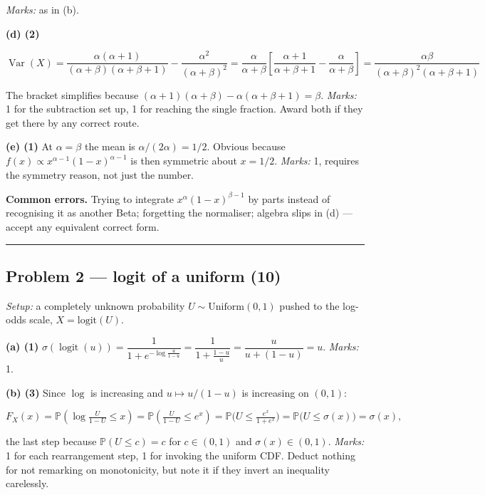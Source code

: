 \documentclass[
  11pt,
  a4paper,
]{article}
\newcommand{\PP}{\mathbb{P}}
\newcommand{\Var}{\operatorname{Var}}
\newcommand{\sig}{\sigma}
\begin{document}
\emph{Marks:} as in (b).

\textbf{(d) (2)}

\[
\Var(X) = \frac{\alpha(\alpha+1)}{(\alpha+\beta)(\alpha+\beta+1)} - \frac{\alpha^2}{(\alpha+\beta)^2}
= \frac{\alpha}{\alpha+\beta}\left[\frac{\alpha+1}{\alpha+\beta+1} - \frac{\alpha}{\alpha+\beta}\right]
= \boxed{\dfrac{\alpha\beta}{(\alpha+\beta)^2(\alpha+\beta+1)}}
\]

The bracket simplifies because
\((\alpha+1)(\alpha+\beta) - \alpha(\alpha+\beta+1) = \beta\).
\emph{Marks:} 1 for the subtraction set up, 1 for reaching the single
fraction. Award both if they get there by any correct route.

\textbf{(e) (1)} At \(\alpha=\beta\) the mean is
\(\alpha/(2\alpha) = 1/2\). Obvious because
\(f(x) \propto x^{\alpha-1}(1-x)^{\alpha-1}\) is then symmetric about
\(x = 1/2\). \emph{Marks:} 1, requires the symmetry reason, not just the
number.

\textbf{Common errors.} Trying to integrate \(x^\alpha(1-x)^{\beta-1}\)
by parts instead of recognising it as another Beta; forgetting the
normaliser; algebra slips in (d) --- accept any equivalent correct form.

\begin{center}\rule{0.5\linewidth}{0.5pt}\end{center}

\subsection{Problem 2 --- logit of a uniform
(10)}\label{problem-2-logit-of-a-uniform-10}

\emph{Setup:} a completely unknown probability
\(U\sim\mathrm{Uniform}(0,1)\) pushed to the log-odds scale,
\(X=\mathrm{logit}(U)\).

\textbf{(a) (1)}
\(\sig(\operatorname{logit}(u)) = \dfrac{1}{1+e^{-\log\frac{u}{1-u}}}
= \dfrac{1}{1+\frac{1-u}{u}} = \dfrac{u}{u + (1-u)} = u\). \emph{Marks:}
1.

\textbf{(b) (3)} Since \(\log\) is increasing and \(u \mapsto u/(1-u)\)
is increasing on \((0,1)\):

\[
F_X(x) = \PP\!\left(\log\tfrac{U}{1-U} \le x\right)
= \PP\!\left(\tfrac{U}{1-U} \le e^{x}\right)
= \PP\!\big(U \le \tfrac{e^{x}}{1+e^{x}}\big)
= \PP\big(U \le \sig(x)\big) = \sig(x),
\]

the last step because \(\PP(U \le c) = c\) for \(c \in (0,1)\) and
\(\sig(x) \in (0,1)\). \emph{Marks:} 1 for each rearrangement step, 1
for invoking the uniform CDF. Deduct nothing for not remarking on
monotonicity, but note it if they invert an inequality carelessly.
\end{document}
